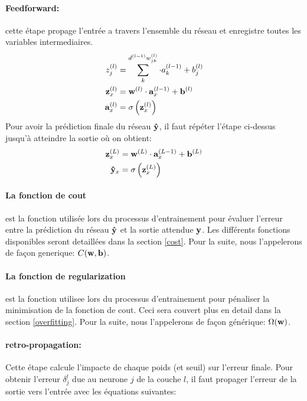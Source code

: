 \documentclass[11pt]{article}
\begin{document}
\paragraph{Feedforward:} cette \'etape propage l'entr\'ee a travers l'ensemble du
r\'eseau et enregistre toutes les variables intermediaires.
\begin{equation}
	\begin{aligned}
		z_j^{(l)} &= \sum_k^{d^{(l-1)}{w_{jk}^{(l)}}} \cdot a_{k}^{(l-1)} + b_{j}^{(l)}\\
		{\bf z}_x^{(l)} &= {\bf w}^{(l)} \cdot {\bf a}_x^{(l-1)} + {\bf b}^{(l)}\\
		{\bf a}_x^{(l)} &= \sigma\left({\bf z}_x^{(l)}\right)\\
	\end{aligned}
\end{equation}
Pour avoir la pr\'ediction finale du r\'eseau ${\bf \hat{y}}$, il faut r\'ep\'eter l'\'etape
ci-dessus jusqu'\`a atteindre la sortie o\`u on obtient:
\begin{equation}
	\begin{aligned}
		{\bf z}_x^{(L)} &= {\bf w}^{(L)} \cdot {\bf a}_x^{(L-1)} + {\bf b}^{(L)}\\
		{\bf \hat{y}}_x &= \sigma\left({\bf z}_x^{(L)}\right)\\
	\end{aligned}
\end{equation}

\paragraph{La fonction de cout}est la fonction utilis\'ee lors du processus
d'entrainement pour \'evaluer l'erreur entre la pr\'ediction du r\'eseau
${\bf \hat{y}}$ et la sortie attendue ${\bf y}$. Les diff\'erents fonctions
disponibles seront detaill\'ees dans la section \ref{cost}.
Pour la suite, nous l'appelerons de fa\c con generique: $C({\bf w}, {\bf b})$.

\paragraph{La fonction de regularization}est la fonction utilisee lors du processus
d'entrainement pour p\'enaliser la minimisation de la fonction de cout. Ceci sera
couvert plus en detail dans la section \ref{overfitting}.
Pour la suite, nous l'appelerons de fa\c con g\'en\'erique: $\Omega({\bf w})$.

\paragraph{retro-propagation:} Cette \'etape calcule l'impacte de chaque poids
(et seuil) sur l'erreur finale. Pour obtenir l'erreur $\delta_j^l$ due au neurone
$j$ de la couche $l$, il faut propager l'erreur de la sortie vers l'entr\'ee
avec les \'equations suivantes:
\end{document}
